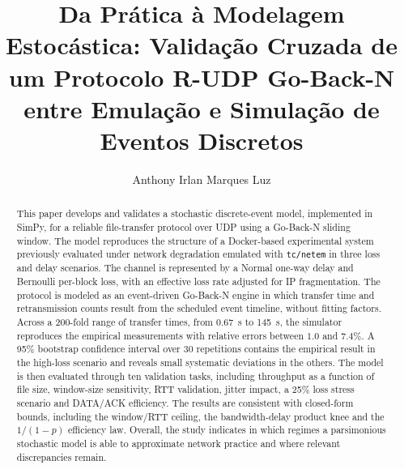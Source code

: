 \documentclass[12pt]{article}
\title{Da Prática à Modelagem Estocástica: Validação Cruzada de um Protocolo R-UDP Go-Back-N entre Emulação e Simulação de Eventos Discretos
}
\author{Anthony Irlan Marques Luz\inst{1}}
\begin{document}
\maketitle

\begin{abstract}
  This paper develops and validates a stochastic discrete-event model, implemented in
  SimPy, for a reliable file-transfer protocol over UDP using a Go-Back-N sliding window.
  The model reproduces the structure of a Docker-based experimental system previously
  evaluated under network degradation emulated with \texttt{tc/netem} in three loss and
  delay scenarios. The channel is represented by a Normal one-way delay and Bernoulli
  per-block loss, with an effective loss rate adjusted for IP fragmentation. The protocol
  is modeled as an event-driven Go-Back-N engine in which transfer time and retransmission
  counts result from the scheduled event timeline, without fitting factors. Across a
  200-fold range of transfer times, from 0.67~s to 145~s, the simulator reproduces the
  empirical measurements with relative errors between $1.0$ and $7.4\%$. A 95\% bootstrap
  confidence interval over 30 repetitions contains the empirical result in the high-loss
  scenario and reveals small systematic deviations in the others. The model is then
  evaluated through ten validation tasks, including throughput as a function of file size,
  window-size sensitivity, RTT validation, jitter impact, a 25\% loss stress scenario and
  DATA/ACK efficiency. The results are consistent with closed-form bounds, including the
  window/RTT ceiling, the bandwidth-delay product knee and the $1/(1-p)$ efficiency law.
  Overall, the study indicates in which regimes a parsimonious stochastic model is able to
  approximate network practice and where relevant discrepancies remain.
\end{abstract}
\end{document}
